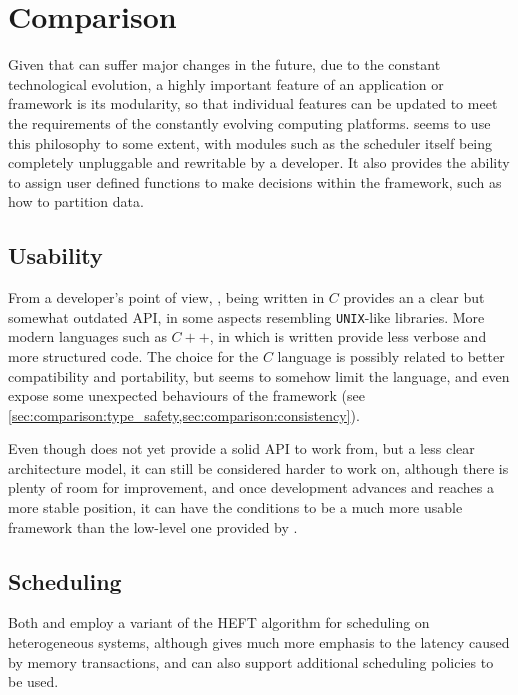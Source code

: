 \documentclass[main.tex]{subfiles}
\begin{document}
\section{Comparison} \label{sec:comparison}

Given that \hetplats can suffer major changes in the future, due to the constant technological evolution, a highly important feature of an application or framework is its modularity, so that individual features can be updated to meet the requirements of the constantly evolving computing platforms. \starpu seems to use this philosophy to some extent, with modules such as the scheduler itself being completely unpluggable and rewritable by a developer. It also provides the ability to assign user defined functions to make decisions within the framework, such as how to partition data.

\subsection{Usability}

From a developer's point of view, \starpu, being written in $C$ provides an a clear but somewhat outdated API, in some aspects resembling \texttt{UNIX}-like libraries. More modern languages such as $C++$, in which \gama is written provide less verbose and more structured code. The choice for the $C$ language is possibly related to better compatibility and portability, but seems to somehow limit the language, and even expose some unexpected behaviours of the framework (see \cref{sec:comparison:type_safety,sec:comparison:consistency}).

Even though \gama does not yet provide a solid API to work from, but a less clear architecture model, it can still be considered harder to work on, although there is plenty of room for improvement, and once development advances and reaches a more stable position, it can have the conditions to be a much more usable framework than the low-level one provided by \starpu.

\subsection{Scheduling}

Both \starpu and \gama employ a variant of the \acs{HEFT} algorithm for scheduling on heterogeneous systems, although \starpu gives much more emphasis to the latency caused by memory transactions, and can also support additional scheduling policies to be used.
\end{document}

